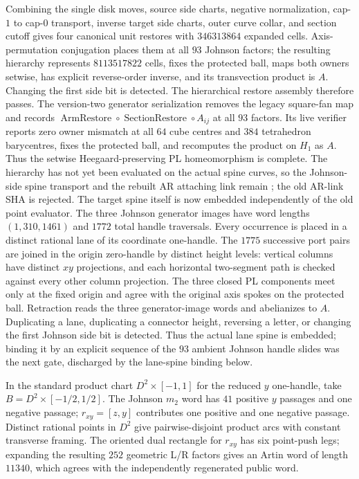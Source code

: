 Combining the single disk moves, source side charts, negative normalization,
cap-$1$ to cap-$0$ transport, inverse target side charts, outer curve collar,
and section cutoff gives four canonical unit restores with $346313864$
expanded cells.  Axis-permutation conjugation places them at all $93$ Johnson
factors; the resulting hierarchy represents $8113517822$ cells, fixes the
protected ball, maps both owners setwise, has explicit reverse-order inverse,
and its transvection product is $A$.  Changing the first side bit is detected.
The hierarchical restore assembly therefore passes.  The version-two
generator serialization removes the legacy square-fan map and records
$\operatorname{ArmRestore}\circ\operatorname{SectionRestore}\circ A_{ij}$ at
all $93$ factors.  Its live verifier reports zero owner mismatch at all $64$
cube centres and $384$ tetrahedron barycentres, fixes the protected ball, and
recomputes the product on $H_1$ as $A$.  Thus the setwise Heegaard-preserving
PL homeomorphism is complete.  The hierarchy has not yet been evaluated on the
actual spine curves, so the Johnson-side spine transport and the rebuilt AR
attaching link remain \Open; the old AR-link SHA is rejected.
The target spine itself is now embedded independently of the old point
evaluator.  The three Johnson generator images have word lengths
$(1,310,1461)$ and $1772$ total handle traversals.  Every occurrence is placed
in a distinct rational lane of its coordinate one-handle.  The $1775$
successive port pairs are joined in the origin zero-handle by distinct height
levels: vertical columns have distinct $xy$ projections, and each horizontal
two-segment path is checked against every other column projection.  The three
closed PL components meet only at the fixed origin and agree with the original
axis spokes on the protected ball.  Retraction reads the three generator-image
words and abelianizes to $A$.  Duplicating a lane, duplicating a connector
height, reversing a letter, or changing the first Johnson side bit is detected.
Thus the actual lane spine is embedded; binding it by an explicit sequence of
the $93$ ambient Johnson handle slides was the next gate, discharged by the
lane-spine binding below.

In the standard product chart $D^2\times[-1,1]$ for the reduced $y$
one-handle, take $B=D^2\times[-1/2,1/2]$.  The Johnson $m_2$ word has $41$
positive $y$ passages and one negative passage; $r_{xy}=[z,y]$ contributes one
positive and one negative passage.  Distinct rational points in $D^2$ give
pairwise-disjoint product arcs with constant transverse framing.  The oriented
dual rectangle for $r_{xy}$ has six point-push legs; expanding the resulting
$252$ geometric L/R factors gives an Artin word of length $11340$, which
agrees with the independently regenerated public word.

